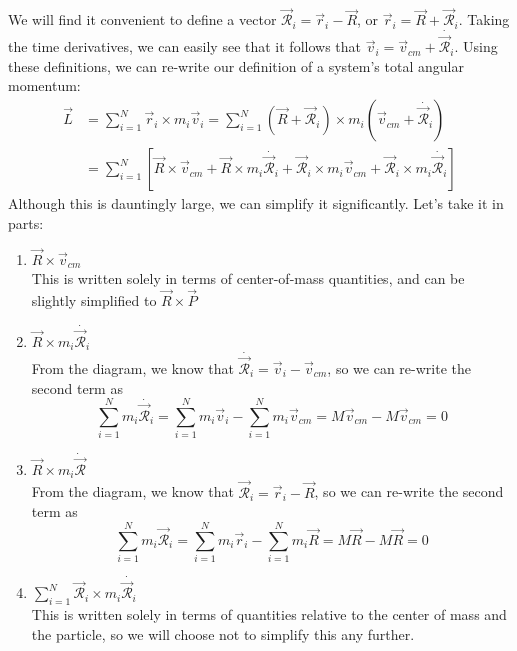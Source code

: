 \documentclass[a4paper]{article}
\begin{document}
We will find it convenient to define a vector $\vec{\mathcal{R}}_i = \vec{r}_i-\vec{R}$,
or $\vec{r}_i = \vec{R}+\vec{\mathcal{R}}_i$. Taking the time derivatives, we
can easily see that it follows that
$\vec{v}_i = \vec{v}_{cm} + \dot{\vec{\mathcal{R}}_i}$. Using these definitions,
we can re-write our definition of a system's total angular momentum:
\begin{align*}
    \vec{L} &= \sum_{i=1}^N \vec{r}_i\times m_i\vec{v}_i =
    \sum_{i=1}^N (\vec{R}+\vec{\mathcal{R}}_i) \times
        m_i(\vec{v}_{cm}+\dot{\vec{\mathcal{R}}_i})\\
    &= \sum_{i=1}^N\left[ \vec{R}\times\vec{v}_{cm} +
        \vec{R}\times m_i\dot{\vec{\mathcal{R}}_i} +
        \vec{\mathcal{R}}_i\times m_i\vec{v}_{cm} +
        \vec{\mathcal{R}}_i \times m_i\dot{\vec{\mathcal{R}}_i}
        \right]
\end{align*}
Although this is dauntingly large, we can simplify it significantly. Let's
take it in parts:
\begin{enumerate}
    \item $\vec{R}\times\vec{v}_{cm}$\\
    This is written solely in terms of center-of-mass quantities, and can be
    slightly simplified to $\vec{R}\times\vec{P}$

    \item $\vec{R}\times m_i\dot{\vec{\mathcal{R}}_i}$\\
    From the diagram, we know that
    $\dot{\vec{\mathcal{R}}_i} = \vec{v}_i - \vec{v}_{cm}$, so we can re-write
    the second term as
    \[
        \sum_{i=1}^N m_i\dot{\vec{\mathcal{R}}_i} = \sum_{i=1}^N m_i\vec{v}_i - 
        \sum_{i=1}^N m_i\vec{v}_{cm} = M\vec{v}_{cm} - M\vec{v}_{cm} = 0
    \]

    \item $\vec{R}\times m_i\dot{\vec{\mathcal{R}}}$\\
    From the diagram, we know that $\vec{\mathcal{R}}_i = \vec{r}_i-\vec{R}$, so
    we can re-write the second term as
    \[
        \sum_{i=1}^N m_i\vec{\mathcal{R}}_i = \sum_{i=1}^N m_i\vec{r}_i - 
        \sum_{i=1}^N m_i\vec{R} = M\vec{R} - M\vec{R} = 0
    \]

    \item $\sum_{i=1}^N \vec{\mathcal{R}}_i \times m_i\dot{\vec{\mathcal{R}}_i}$\\
    This is written solely in terms of quantities relative to the center of mass
    and the particle, so we will choose not to simplify this any further.
\end{enumerate}
\end{document}

